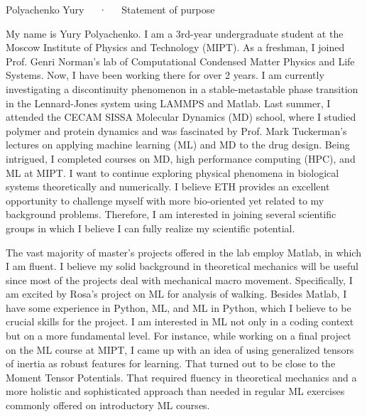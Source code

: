 \documentclass[12pt, a4paper]{awesome-cv}
\begin{document}
\makecvheader[C]

\makecvfooter
  {\thepage}
  {Polyachenko Yury~~~·~~~Statement of purpose}
  {\thepage}


\begin{cvletter}

My name is Yury Polyachenko. I am a 3rd-year undergraduate student at the Moscow Institute of Physics and Technology (MIPT). As a freshman, I joined Prof. Genri Norman's lab of Computational Condensed Matter Physics and Life Systems. Now, I have been working there for over 2 years. I am currently investigating a discontinuity phenomenon in a stable-metastable phase transition in the Lennard-Jones system using LAMMPS and Matlab. Last summer, I attended the CECAM SISSA Molecular Dynamics (MD) school, where I studied polymer and protein dynamics and was fascinated by Prof. Mark Tuckerman's lectures on applying machine learning (ML) and MD to the drug design. Being intrigued, I completed courses on MD, high performance computing (HPC), and ML at MIPT. I want to continue exploring physical phenomena in biological systems theoretically and numerically. I believe ETH provides an excellent opportunity to challenge myself with more bio-oriented yet related to my background problems. Therefore, I am interested in joining several scientific groups in which I believe I can fully realize my scientific potential.

The vast majority of master's projects offered in the lab employ Matlab, in which I am fluent. I believe my solid background in theoretical mechanics will be useful since most of the projects deal with mechanical macro movement. Specifically, I am excited by Rosa's project on ML for analysis of walking. Besides Matlab, I have some experience in Python, ML, and ML in Python, which I believe to be crucial skills for the project. I am interested in ML not only in a coding context but on a more fundamental level. For instance, while working on a final project on the ML course at MIPT, I came up with an idea of using generalized tensors of inertia as robust features for learning. That turned out to be close to the Moment Tensor Potentials. That required fluency in theoretical mechanics and a more holistic and sophisticated approach than needed in regular ML exercises commonly offered on introductory ML courses.


\end{cvletter}
\end{document}
